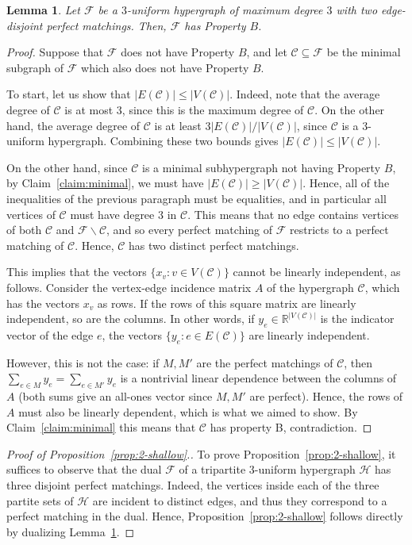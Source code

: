 \documentclass[11pt, a4paper]{article}
\numberwithin{theorem}{section} %
\newtheorem{lemma}[theorem]{Lemma}
\theoremstyle{remark}
\theoremstyle{definition}
\def\cC{\mathcal{C}}
\def\cF{\mathcal{F}}
\def\cH{\mathcal{H}}
\def\bR{\mathbb{R}}
\begin{document}
\begin{lemma}\label{lemma:property_B}
Let $\cF$ be a $3$-uniform hypergraph of maximum degree $3$ with two edge-disjoint perfect matchings. Then, $\cF$ has Property $B$. 
\end{lemma}
\begin{proof}
Suppose that $\cF$ does not have Property $B$, and let $\cC\subseteq \cF$ be the minimal subgraph of $\cF$ which also does not have Property $B$. 

To start, let us show that $|E(\cC)|\leq |V(\cC)|$. Indeed, note that the average degree of $\cC$ is at most $3$, since this is the maximum degree of $\cC$. On the other hand, the average degree of $\cC$ is at least ${3|E(\cC)|}/{|V(\cC)|}$, since $\cC$ is a $3$-uniform hypergraph. Combining these two bounds gives $|E(\cC)|\leq |V(\cC)|$.

On the other hand, since $\cC$ is a minimal subhypergraph not having Property $B$, by Claim~\ref{claim:minimal}, we must have $|E(\cC)|\geq |V(\cC)|$. Hence, all of the inequalities of the previous paragraph must be equalities, and in particular all vertices of $\cC$ must have degree $3$ in $\cC$. This means that no edge contains vertices of both $\cC$ and $\cF\backslash \cC$, and so every perfect matching of $\cF$ restricts to a perfect matching of $\cC$. Hence, $\cC$ has two distinct perfect matchings.

This implies that the vectors $\{x_v:v\in V(\cC)\}$ cannot be linearly independent, as follows. Consider the vertex-edge incidence matrix $A$ of the hypergraph $\cC$, which has the vectors $x_v$ as rows. If the rows of this square matrix are linearly independent, so are the columns. In other words, if $y_e\in \bR^{|V(\cC)|}$ is the indicator vector of the edge $e$, the vectors $\{y_e:e\in E(\cC)\}$ are linearly independent.

However, this is not the case: if $M, M'$ are the perfect matchings of $\cC$, then $\sum_{e\in M} y_e=\sum_{e\in M'} y_e$ is a nontrivial linear dependence between the columns of $A$ (both sums give an all-ones vector since $M, M'$ are perfect). Hence, the rows of $A$ must also be linearly dependent, which is what we aimed to show. By Claim~\ref{claim:minimal} this means that $\cC$ has property B, contradiction.
\end{proof}

\begin{proof}[Proof of Proposition~\ref{prop:2-shallow}.]
To prove Proposition~\ref{prop:2-shallow}, it suffices to observe that the dual $\cF$ of a tripartite $3$-uniform hypergraph $\cH$ has three disjoint perfect matchings. Indeed, the vertices inside each of the three partite sets of $\cH$ are incident to distinct edges, and thus they correspond to a perfect matching in the dual. Hence, Proposition~\ref{prop:2-shallow} follows directly by dualizing Lemma~\ref{lemma:property_B}.
\end{proof}
\end{document}
